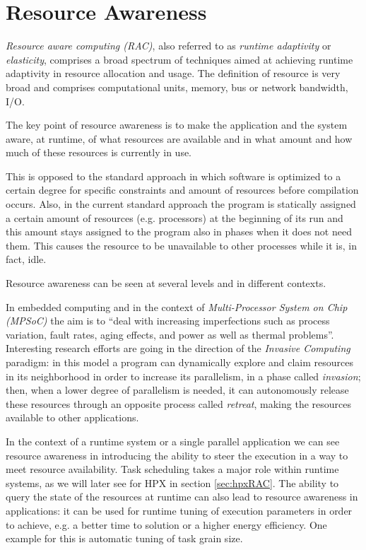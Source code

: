 
\section{Resource Awareness} \label{sec:resourceAwareness}

\emph{Resource aware computing (RAC)}, also referred to as \emph{runtime adaptivity} or \emph{elasticity}, comprises a broad spectrum of techniques aimed at achieving runtime adaptivity in resource allocation and usage. The definition of resource is very broad and comprises computational units, memory, bus or network bandwidth, I/O.

The key point of resource awareness is to make the application and the system aware, at runtime, of what resources are available and in what amount and how much of these resources is currently in use.

This is opposed to the standard approach in which software is optimized to a certain degree for specific constraints and amount of resources before compilation occurs.
Also, in the current standard approach the program is statically assigned a certain amount of resources (e.g. processors) at the beginning of its run and this amount stays assigned to the program also in phases when it does not need them. This causes the resource to be unavailable to other processes while it is, in fact, idle.

Resource awareness can be seen at several levels and in different contexts.

In embedded computing and in the context of \emph{Multi-Processor System on Chip (MPSoC)} the aim is to ``deal with increasing imperfections such as process variation, fault rates, aging effects, and power as well as thermal problems''\cite{hannig2011resource}. Interesting research efforts are going in the direction of the \emph{Invasive Computing}\cite{teich2011invasive} paradigm: in this model a program can dynamically explore and claim resources in its neighborhood in order to increase its parallelism, in a phase called \emph{invasion}; then, when a lower degree of parallelism is needed, it can autonomously release these resources through an opposite process called \emph{retreat}, making the resources available to other applications.

In the context of a runtime system or a single parallel application we can see resource awareness in introducing the ability to steer the execution in a way to meet resource availability. Task scheduling takes a major role within runtime systems, as we will later see for HPX in section \ref{sec:hpxRAC}. The ability to query the state of the resources at runtime can also lead to resource awareness in applications: it can be used for runtime tuning of execution parameters in order to achieve, e.g. a better time to solution or a higher energy efficiency. One example for this is automatic tuning of task grain size\cite{grubel2016dynamic}.

